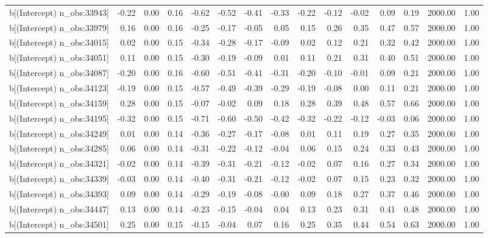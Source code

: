 \begin{table}[ht]
\begin{tabular}{rrrrrrrrrrrrrrr}
  b[(Intercept) n\_obs:33943] & -0.22 & 0.00 & 0.16 & -0.62 & -0.52 & -0.41 & -0.33 & -0.22 & -0.12 & -0.02 & 0.09 & 0.19 & 2000.00 & 1.00 \\ 
  b[(Intercept) n\_obs:33979] & 0.16 & 0.00 & 0.16 & -0.25 & -0.17 & -0.05 & 0.05 & 0.15 & 0.26 & 0.35 & 0.47 & 0.57 & 2000.00 & 1.00 \\ 
  b[(Intercept) n\_obs:34015] & 0.02 & 0.00 & 0.15 & -0.34 & -0.28 & -0.17 & -0.09 & 0.02 & 0.12 & 0.21 & 0.32 & 0.42 & 2000.00 & 1.00 \\ 
  b[(Intercept) n\_obs:34051] & 0.11 & 0.00 & 0.15 & -0.30 & -0.19 & -0.09 & 0.01 & 0.11 & 0.21 & 0.31 & 0.40 & 0.51 & 2000.00 & 1.00 \\ 
  b[(Intercept) n\_obs:34087] & -0.20 & 0.00 & 0.16 & -0.60 & -0.51 & -0.41 & -0.31 & -0.20 & -0.10 & -0.01 & 0.09 & 0.21 & 2000.00 & 1.00 \\ 
  b[(Intercept) n\_obs:34123] & -0.19 & 0.00 & 0.15 & -0.57 & -0.49 & -0.39 & -0.29 & -0.19 & -0.08 & 0.00 & 0.11 & 0.21 & 2000.00 & 1.00 \\ 
  b[(Intercept) n\_obs:34159] & 0.28 & 0.00 & 0.15 & -0.07 & -0.02 & 0.09 & 0.18 & 0.28 & 0.39 & 0.48 & 0.57 & 0.66 & 2000.00 & 1.00 \\ 
  b[(Intercept) n\_obs:34195] & -0.32 & 0.00 & 0.15 & -0.71 & -0.60 & -0.50 & -0.42 & -0.32 & -0.22 & -0.12 & -0.03 & 0.06 & 2000.00 & 1.00 \\ 
  b[(Intercept) n\_obs:34249] & 0.01 & 0.00 & 0.14 & -0.36 & -0.27 & -0.17 & -0.08 & 0.01 & 0.11 & 0.19 & 0.27 & 0.35 & 2000.00 & 1.00 \\ 
  b[(Intercept) n\_obs:34285] & 0.06 & 0.00 & 0.14 & -0.31 & -0.22 & -0.12 & -0.04 & 0.06 & 0.15 & 0.24 & 0.33 & 0.43 & 2000.00 & 1.00 \\ 
  b[(Intercept) n\_obs:34321] & -0.02 & 0.00 & 0.14 & -0.39 & -0.31 & -0.21 & -0.12 & -0.02 & 0.07 & 0.16 & 0.27 & 0.34 & 2000.00 & 1.00 \\ 
  b[(Intercept) n\_obs:34339] & -0.03 & 0.00 & 0.14 & -0.40 & -0.31 & -0.21 & -0.12 & -0.02 & 0.07 & 0.15 & 0.23 & 0.32 & 2000.00 & 1.00 \\ 
  b[(Intercept) n\_obs:34393] & 0.09 & 0.00 & 0.14 & -0.29 & -0.19 & -0.08 & -0.00 & 0.09 & 0.18 & 0.27 & 0.37 & 0.46 & 2000.00 & 1.00 \\ 
  b[(Intercept) n\_obs:34447] & 0.13 & 0.00 & 0.14 & -0.23 & -0.15 & -0.04 & 0.04 & 0.13 & 0.23 & 0.31 & 0.41 & 0.48 & 2000.00 & 1.00 \\ 
  b[(Intercept) n\_obs:34501] & 0.25 & 0.00 & 0.15 & -0.15 & -0.04 & 0.07 & 0.16 & 0.25 & 0.35 & 0.44 & 0.54 & 0.63 & 2000.00 & 1.00 \\ 

\end{tabular}
\end{table}
